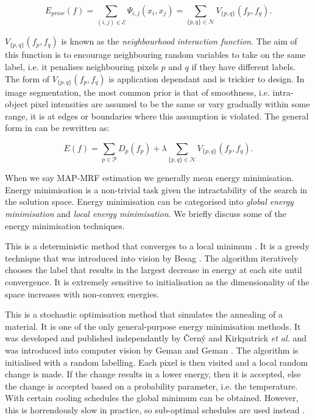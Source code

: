 \begin{equation}
	E_{prior}(f) = \sum_{(i,j) \in \mathcal{E}}\Psi_{i,j}(x_i,x_j) = \sum_{\{p,q\} \in \mathcal{N}}V_{\{p,q\}}(f_p,f_q).
	\label{eq:priorenergy}
\end{equation}

$V_{\{p,q\}}(f_p,f_q)$ is known as the \textit{neighbourhood interaction function}.
The aim of this function is to encourage neighbouring random variables to take on the same label, i.e. it penalises neighbouring pixels $p$ and $q$ if they have different labels.
The form of $V_{\{p,q\}}(f_p,f_q)$ is application dependant and is trickier to design.
In image segmentation, the most common prior is that of smoothness, i.e. intra-object pixel intensities are assumed to be the same or vary gradually within some range, it is at edges or boundaries where this assumption is violated.
The general form in  can be rewritten as:

\begin{equation}
	E(f) = \sum_{p \in \mathcal{P}}D_p(f_p) + \lambda \sum_{\{p,q\} \in \mathcal{N}}V_{\{p,q\}}(f_p,f_q).
	\label{eq:generalformexpanded}
\end{equation}
 
 When we say MAP-MRF estimation we generally mean energy minimisation.
 Energy minimisation is a non-trivial task given the intractability of the search in the solution space.
 Energy minimisation can be categorised into \textit{global energy minimisation} and \textit{local energy minimisation}.
 We briefly discuss some of the energy minimisation techniques.
 
\begin{definition}
	This is a deterministic method that converges to a local minimum \citep{Cassisa2010}.
	It is a greedy technique that was introduced into vision by Besag \citep{Besag1986,Veksler1999}.
	The algorithm iteratively chooses the label that results in the largest decrease in energy at each site until convergence.
	It is extremely sensitive to initialisation as the dimensionality of the space increases with non-convex energies.
\end{definition}
 
\begin{definition}
	This is a stochastic optimisation method that simulates the annealing of a material.
	It is one of the only general-purpose energy minimisation methods.
	It was developed and published independantly by \v{C}ern{\'y} \citep{Cerny1985} and Kirkpatrick \textit{et al.} \citep{Kirkpatrick1983} and was introduced into computer vision by Geman and Geman \citep{Geman1984}.
	The algorithm is initialised with a random labelling.
	Each pixel is then visited and a local random change is made.
	If the change results in a lower energy, then it is accepted, else the change is accepted based on a probability parameter, i.e. the temperature.
	With certain cooling schedules the global minimum can be obtained. However, this is horrendously slow in practice, so sub-optimal schedules are used instead \citep{Geman1984}.
\end{definition}

